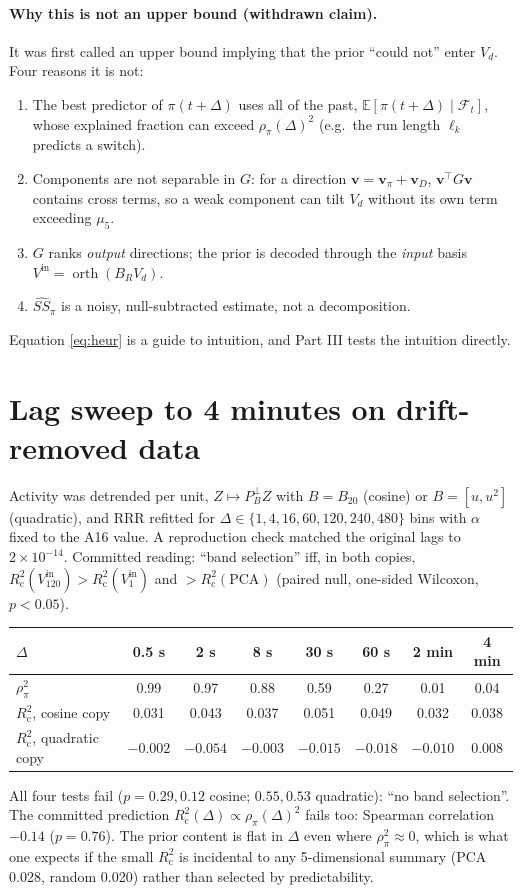 \documentclass[11pt]{article}
\newcommand{\E}{\mathbb{E}}
\newcommand{\orth}{\operatorname{orth}}
\newcommand{\Rc}{R^2_{\mathrm{c}}}
\begin{document}
\paragraph{Why this is not an upper bound (withdrawn claim).} It was first called an upper bound implying that the
prior ``could not'' enter $V_d$. Four reasons it is not:
\begin{enumerate}
\item The best predictor of $\pi(t+\Delta)$ uses all of the past, $\E[\pi(t+\Delta) \mid \mathcal F_t]$, whose explained
  fraction can exceed $\rho_\pi(\Delta)^2$ (e.g.\ the run length $\ell_k$ predicts a switch).
\item Components are not separable in $G$: for a direction $\bm v = \bm v_\pi + \bm v_D$,
  $\bm v^\top G \bm v$ contains cross terms, so a weak component can tilt $V_d$ without its own term exceeding
  $\mu_5$.
\item $G$ ranks \emph{output} directions; the prior is decoded through the \emph{input} basis
  $V^{\mathrm{in}} = \orth(B_R V_d)$.
\item $\widehat{SS}_\pi$ is a noisy, null-subtracted estimate, not a decomposition.
\end{enumerate}
Equation \eqref{eq:heur} is a guide to intuition, and Part III tests the intuition directly.

\section{Lag sweep to 4 minutes on drift-removed data}

Activity was detrended per unit, $Z \mapsto P^\perp_{B} Z$ with $B = B_{20}$ (cosine) or $B = [u, u^2]$ (quadratic),
and RRR refitted for $\Delta \in \{1, 4, 16, 60, 120, 240, 480\}$ bins with $\alpha$ fixed to the A16 value. A
reproduction check matched the original lags to $2\times10^{-14}$. Committed reading: ``band selection'' iff, in
both copies, $\Rc(V^{\mathrm{in}}_{120}) > \Rc(V^{\mathrm{in}}_{1})$ and $> \Rc(\mathrm{PCA})$ (paired null,
one-sided Wilcoxon, $p < 0.05$).

\begin{center}
\begin{tabular}{lccccccc}
\toprule
$\Delta$ & 0.5 s & 2 s & 8 s & 30 s & 60 s & 2 min & 4 min \\
\midrule
$\rho_\pi^2$ & 0.99 & 0.97 & 0.88 & 0.59 & 0.27 & 0.01 & 0.04 \\
$\Rc$, cosine copy & 0.031 & 0.043 & 0.037 & 0.051 & 0.049 & 0.032 & 0.038 \\
$\Rc$, quadratic copy & $-0.002$ & $-0.054$ & $-0.003$ & $-0.015$ & $-0.018$ & $-0.010$ & 0.008 \\
\bottomrule
\end{tabular}
\end{center}
All four tests fail ($p = 0.29, 0.12$ cosine; $0.55, 0.53$ quadratic): ``no band selection''. The committed
prediction $\Rc(\Delta) \propto \rho_\pi(\Delta)^2$ fails too: Spearman correlation $-0.14$ ($p = 0.76$). The prior
content is flat in $\Delta$ even where $\rho_\pi^2 \approx 0$, which is what one expects if the small $\Rc$ is
incidental to any 5-dimensional summary (PCA 0.028, random 0.020) rather than selected by predictability.
\end{document}

